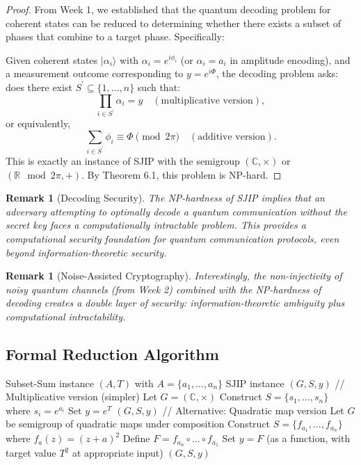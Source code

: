 \documentclass[12pt]{article}
\newtheorem{remark}[theorem]{Remark}
\newcommand{\C}{\mathbb{C}}
\newcommand{\R}{\mathbb{R}}
\begin{document}
\begin{proof}
From Week 1, we established that the quantum decoding problem for coherent states can be reduced to determining whether there exists a subset of phases that combine to a target phase. Specifically:

Given coherent states $|\alpha_{i}\rangle$ with $\alpha_{i} = e^{i\phi_{i}}$ (or $\alpha_{i} = a_{i}$ in amplitude encoding), and a measurement outcome corresponding to $y = e^{i\Phi}$, the decoding problem asks: does there exist $S^{\prime}\subseteq \{1,\ldots ,n\}$ such that:
\[
\prod_{i\in S^{\prime}}\alpha_{i} = y \quad (\text{multiplicative version}),
\]
or equivalently,
\[
\sum_{i\in S^{\prime}}\phi_{i}\equiv \Phi \pmod {2\pi} \quad (\text{additive version}).
\]
This is exactly an instance of SJIP with the semigroup $(\C,\times)$ or $(\R \mod 2\pi , +)$. By Theorem 6.1, this problem is NP-hard.
\end{proof}

\begin{remark}[Decoding Security]
The NP-hardness of SJIP implies that an adversary attempting to optimally decode a quantum communication without the secret key faces a computationally intractable problem. This provides a computational security foundation for quantum communication protocols, even beyond information-theoretic security.
\end{remark}

\begin{remark}[Noise-Assisted Cryptography]
Interestingly, the non-injectivity of noisy quantum channels (from Week 2) combined with the NP-hardness of decoding creates a double layer of security: information-theoretic ambiguity plus computational intractability.
\end{remark}

\subsection{Formal Reduction Algorithm}
\begin{algorithm}
\caption{Polynomial-Time Reduction: Subset-Sum to SJIP}
\begin{algorithmic}[1]
\Require Subset-Sum instance $(A,T)$ with $A = \{a_{1},\ldots ,a_{n}\}$
\Ensure SJIP instance $(G,S,y)$
\State // Multiplicative version (simpler)
\State Let $G = (\C,\times)$
\State Construct $S = \{s_{1},\ldots ,s_{n}\}$ where $s_{i} = e^{a_{i}}$
\State Set $y = e^{T}$
\State \Return $(G,S,y)$
\State
\State // Alternative: Quadratic map version
\State Let $G$ be semigroup of quadratic maps under composition
\State Construct $S = \{f_{a_{1}},\ldots ,f_{a_{n}}\}$ where $f_{a}(z) = (z + a)^{2}$
\State Define $F = f_{a_{n}}\circ \dots \circ f_{a_{1}}$
\State Set $y = F$ (as a function, with target value $T^{2}$ at appropriate input)
\State \Return $(G,S,y)$
\end{algorithmic}
\end{algorithm}
\end{document}

